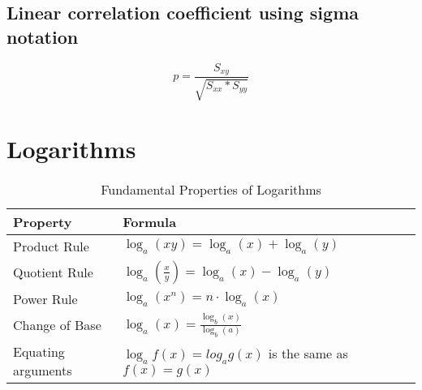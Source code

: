 \documentclass{article}
\begin{document}
\subsection{Linear correlation coefficient using sigma notation}
\begin{equation}
  p = \frac{S_{xy}}{\sqrt{S_{xx} * S_{yy}}}
\end{equation}
\section{Logarithms}
\begin{table}[htbp]
  \centering
  \begin{tabular}{|l|l|}
    \hline
    \textbf{Property} & \textbf{Formula} \\
    \hline
    Product Rule & $\log_a(xy) = \log_a(x) + \log_a(y)$ \\
    \hline
    Quotient Rule & $\log_a\left(\frac{x}{y}\right) = \log_a(x) - \log_a(y)$ \\
    \hline
    Power Rule & $\log_a(x^n) = n \cdot \log_a(x)$ \\
    \hline
    Change of Base & $\log_a(x) = \frac{\log_b(x)}{\log_b(a)}$ \\
    \hline
    Equating arguments & $\log_af(x) = log_ag(x)$ is the same as $f(x) = g(x)$ \\
    \hline
  \end{tabular}
  \caption{Fundamental Properties of Logarithms}
  \label{tab:log_properties}
\end{table}
\end{document}
